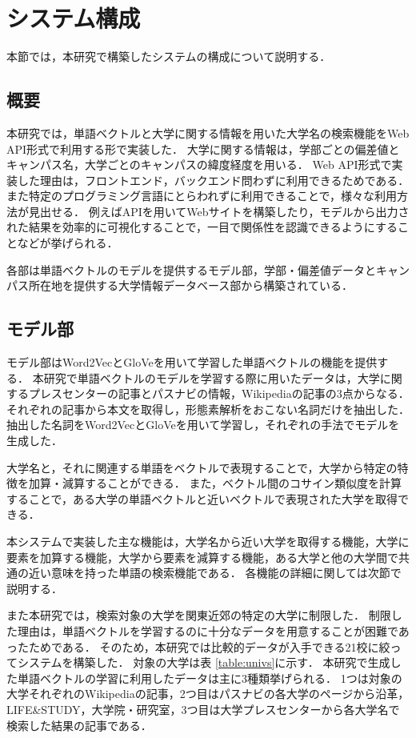 \section{システム構成}
本節では，本研究で構築したシステムの構成について説明する．

\subsection{概要}
本研究では，単語ベクトルと大学に関する情報を用いた大学名の検索機能をWeb API形式で利用する形で実装した．
大学に関する情報は，学部ごとの偏差値とキャンパス名，大学ごとのキャンパスの緯度経度を用いる．
Web API形式で実装した理由は，フロントエンド，バックエンド問わずに利用できるためである．
また特定のプログラミング言語にとらわれずに利用できることで，様々な利用方法が見出せる．
例えばAPIを用いてWebサイトを構築したり，モデルから出力された結果を効率的に可視化することで，一目で関係性を認識できるようにすることなどが挙げられる．

各部は単語ベクトルのモデルを提供するモデル部，学部・偏差値データとキャンパス所在地を提供する大学情報データベース部から構築されている．


\subsection{モデル部}
モデル部はWord2VecとGloVeを用いて学習した単語ベクトルの機能を提供する．
本研究で単語ベクトルのモデルを学習する際に用いたデータは，大学に関するプレスセンター\cite{pressCenter}の記事とパスナビ\cite{passNavi}の情報，Wikipediaの記事の3点からなる．
それぞれの記事から本文を取得し，形態素解析をおこない名詞だけを抽出した．
抽出した名詞をWord2VecとGloVeを用いて学習し，それぞれの手法でモデルを生成した．

大学名と，それに関連する単語をベクトルで表現することで，大学から特定の特徴を加算・減算することができる．
また，ベクトル間のコサイン類似度を計算することで，ある大学の単語ベクトルと近いベクトルで表現された大学を取得できる．

本システムで実装した主な機能は，大学名から近い大学を取得する機能，大学に要素を加算する機能，大学から要素を減算する機能，ある大学と他の大学間で共通の近い意味を持った単語の検索機能である．
各機能の詳細に関しては次節で説明する．

また本研究では，検索対象の大学を関東近郊の特定の大学に制限した．
制限した理由は，単語ベクトルを学習するのに十分なデータを用意することが困難であったためである．
そのため，本研究では比較的データが入手できる21校に絞ってシステムを構築した．
対象の大学は表 \ref{table:univs}に示す．
本研究で生成した単語ベクトルの学習に利用したデータは主に3種類挙げられる．
1つは対象の大学それぞれのWikipediaの記事，2つ目はパスナビの各大学のページから沿革，LIFE\&STUDY，大学院・研究室，3つ目は大学プレスセンターから各大学名で検索した結果の記事である．

